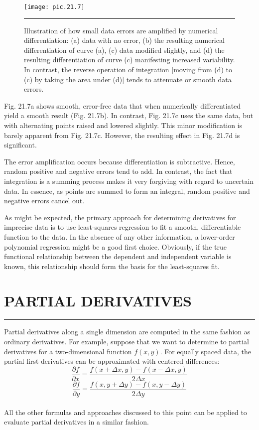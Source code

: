 \documentclass[../main.tex]{subfiles}
\begin{document}
\begin{figure}[hbt!]
	\centering
	\texttt{[image: pic.21.7]}
	\caption{\textsf{Illustration of how small data errors are amplified by numerical differentiation: (a) data with no
error, (b) the resulting numerical differentiation of curve (a), (c) data modified slightly, and (d) the
resulting differentiation of curve (c) manifesting increased variability. In contrast, the reverse
operation of integration [moving from (d) to (c) by taking the area under (d)] tends to attenuate 
or smooth data errors.}} \hrule
	\label{pic.21.7}
\end{figure}

Fig. 21.7a shows smooth, error-free data that when numerically differentiated yield
a smooth result (Fig. 21.7b). In contrast, Fig. 21.7c uses the same data, but with alternating points raised and lowered slightly. This minor modification is barely apparent from
Fig. 21.7c. However, the resulting effect in Fig. 21.7d is significant.

The error amplification occurs because differentiation is subtractive. Hence, random
positive and negative errors tend to add. In contrast, the fact that integration is a summing
process makes it very forgiving with regard to uncertain data. In essence, as points are
summed to form an integral, random positive and negative errors cancel out.

As might be expected, the primary approach for determining derivatives for imprecise
data is to use least-squares regression to fit a smooth, differentiable function to the data. In
the absence of any other information, a lower-order polynomial regression might be a good
first choice. Obviously, if the true functional relationship between the dependent and independent variable is known, this relationship should form the basis for the least-squares fit.

\vspace{0,6in}
\section{PARTIAL DERIVATIVES}
\vspace{0,1in}
\hrule
\vspace{0,1in}

Partial derivatives along a single dimension are computed in the same fashion as ordinary
derivatives. For example, suppose that we want to determine to partial derivatives for a
two-dimensional function $f (x, y)$. For equally spaced data, the partial first derivatives can be approximated with centered differences:
\begin{equation}
	\tag{21.22}
	\dfrac{\partial f}{\partial x} = \dfrac{f(x + \Delta x, y) - f(x- \Delta x, y)}{2\Delta x}
\end{equation}
\begin{equation}
	\tag{21.23}
	\dfrac{\partial f}{\partial y} = \dfrac{f(x,y+\Delta y) - f(x,y - \Delta y)}{2 \Delta y}
\end{equation}\\
All the other formulas and approaches discussed to this point can be applied to evaluate
partial derivatives in a similar fashion.
\end{document}
